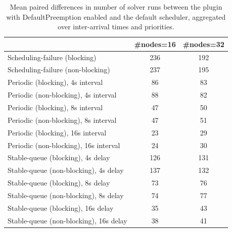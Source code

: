 \begin{table}[t]
\tiny
\setlength{\tabcolsep}{1.2pt}
\renewcommand{\arraystretch}{1.12}
\centering
\caption{Mean paired differences in number of solver runs between the plugin with DefaultPreemption enabled and the default scheduler, aggregated over inter-arrival times and priorities.}
\label{tab:solver_runs-defpreempt1-std0-agg-arrival-prio}
\begin{tabular}{l c c}
\toprule
 & \#nodes=16 & \#nodes=32 \\
\midrule
Scheduling-failure (blocking) & 236 & 192 \\
Scheduling-failure (non-blocking) & 237 & 195 \\
Periodic (blocking), 4s interval & 86 & 83 \\
Periodic (non-blocking), 4s interval & 88 & 82 \\
Periodic (blocking), 8s interval & 47 & 50 \\
Periodic (non-blocking), 8s interval & 47 & 51 \\
Periodic (blocking), 16s interval & 23 & 29 \\
Periodic (non-blocking), 16s interval & 24 & 30 \\
Stable-queue (blocking), 4s delay & 126 & 131 \\
Stable-queue (non-blocking), 4s delay & 137 & 132 \\
Stable-queue (blocking), 8s delay & 73 & 76 \\
Stable-queue (non-blocking), 8s delay & 74 & 77 \\
Stable-queue (blocking), 16s delay & 35 & 43 \\
Stable-queue (non-blocking), 16s delay & 38 & 41 \\
\bottomrule
\end{tabular}
\end{table}
